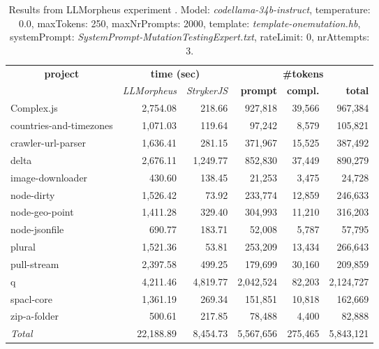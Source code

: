 
\begin{table*}[hbt!]
\centering
{\scriptsize
\begin{tabular}{l||r|r|r|r|r}
\multicolumn{1}{c|}{\bf project} & \multicolumn{2}{|c|}{\bf time (sec)} & \multicolumn{3}{|c|}{\bf \#tokens} \\
               & {\it LLMorpheus} & {\it StrykerJS} & {\bf prompt} & {\bf compl.} & {\bf total} \\
\hline
  Complex.js & 2,754.08 & 218.66 & 927,818 & 39,566 & 967,384 \\ 
countries-and-timezones & 1,071.03 & 119.64 & 97,242 & 8,579 & 105,821 \\ 
crawler-url-parser & 1,636.41 & 281.15 & 371,967 & 15,525 & 387,492 \\ 
delta & 2,676.11 & 1,249.77 & 852,830 & 37,449 & 890,279 \\ 
image-downloader & 430.60 & 138.45 & 21,253 & 3,475 & 24,728 \\ 
node-dirty & 1,526.42 & 73.92 & 233,774 & 12,859 & 246,633 \\ 
node-geo-point & 1,411.28 & 329.40 & 304,993 & 11,210 & 316,203 \\ 
node-jsonfile & 690.77 & 183.71 & 52,008 & 5,787 & 57,795 \\ 
plural & 1,521.36 & 53.81 & 253,209 & 13,434 & 266,643 \\ 
pull-stream & 2,397.58 & 499.25 & 179,699 & 30,160 & 209,859 \\ 
q & 4,211.46 & 4,819.77 & 2,042,524 & 82,203 & 2,124,727 \\ 
spacl-core & 1,361.19 & 269.34 & 151,851 & 10,818 & 162,669 \\ 
zip-a-folder & 500.61 & 217.85 & 78,488 & 4,400 & 82,888 \\ 
\hline
  \textit{Total} & 22,188.89 & 8,454.73 & 5,567,656 & 275,465 & 5,843,121 \\
  \end{tabular}
  }
  \\[2mm]
  \caption{Results from LLMorpheus experiment .
    Model: \textit{codellama-34b-instruct}, 
    temperature: 0.0, 
    maxTokens: 250, 
    maxNrPrompts: 2000, 
    template: \textit{template-onemutation.hb}, 
    systemPrompt: \textit{SystemPrompt-MutationTestingExpert.txt}, 
    rateLimit: 0, 
    nrAttempts: 3.  
  }
  \label{table:Cost:run370:codellama-34b-instruct:template-onemutation.hb:0.0}
\end{table*}